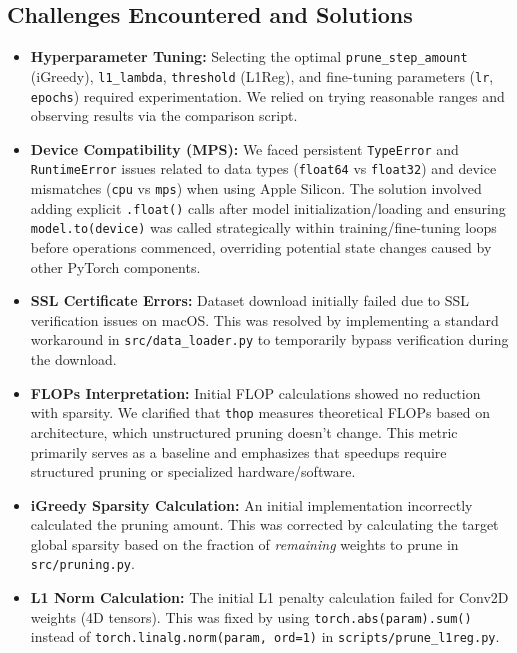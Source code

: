 \documentclass[10pt, article]{article} %
\begin{document}
\subsection{Challenges Encountered and Solutions}
\begin{itemize}
    \item \textbf{Hyperparameter Tuning:} Selecting the optimal \texttt{prune\_step\_amount} (iGreedy), \texttt{l1\_lambda}, \texttt{threshold} (L1Reg), and fine-tuning parameters (\texttt{lr}, \texttt{epochs}) required experimentation. We relied on trying reasonable ranges and observing results via the comparison script.
    \item \textbf{Device Compatibility (MPS):} We faced persistent \texttt{TypeError} and \texttt{RuntimeError} issues related to data types (\texttt{float64} vs \texttt{float32}) and device mismatches (\texttt{cpu} vs \texttt{mps}) when using Apple Silicon. The solution involved adding explicit \texttt{.float()} calls after model initialization/loading and ensuring \texttt{model.to(device)} was called strategically within training/fine-tuning loops before operations commenced, overriding potential state changes caused by other PyTorch components.
    \item \textbf{SSL Certificate Errors:} Dataset download initially failed due to SSL verification issues on macOS. This was resolved by implementing a standard workaround in \texttt{src/data\_loader.py} to temporarily bypass verification during the download.
    \item \textbf{FLOPs Interpretation:} Initial FLOP calculations showed no reduction with sparsity. We clarified that \texttt{thop} measures theoretical FLOPs based on architecture, which unstructured pruning doesn't change. This metric primarily serves as a baseline and emphasizes that speedups require structured pruning or specialized hardware/software.
    \item \textbf{iGreedy Sparsity Calculation:} An initial implementation incorrectly calculated the pruning amount. This was corrected by calculating the target global sparsity based on the fraction of \textit{remaining} weights to prune in \texttt{src/pruning.py}.
    \item \textbf{L1 Norm Calculation:} The initial L1 penalty calculation failed for Conv2D weights (4D tensors). This was fixed by using \texttt{torch.abs(param).sum()} instead of \texttt{torch.linalg.norm(param, ord=1)} in \texttt{scripts/prune\_l1reg.py}.
\end{itemize}
\end{document}
